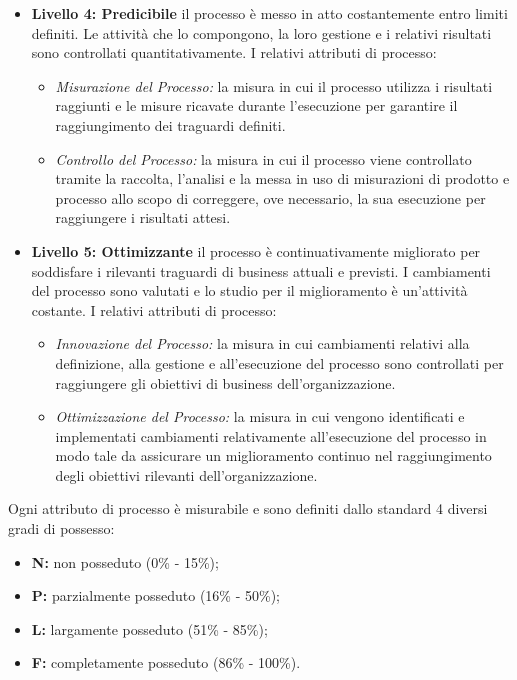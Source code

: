 \begin{itemize}
		\item \textbf{Livello 4: Predicibile} il processo è messo in atto costantemente entro limiti definiti. Le attività che lo compongono, la loro gestione e i relativi risultati sono controllati quantitativamente.
		I relativi attributi di processo:
			\begin{itemize}
				\item \emph{Misurazione del Processo:} la misura in cui il processo utilizza i risultati raggiunti e le misure ricavate durante l'esecuzione per garantire il raggiungimento dei traguardi definiti.
				\item \emph{Controllo del Processo:} la misura in cui il processo viene controllato tramite la raccolta, l'analisi e la messa in uso di misurazioni di prodotto e processo allo scopo di correggere, ove necessario, la sua esecuzione per raggiungere i risultati attesi.	
			\end{itemize}

		\item \textbf{Livello 5: Ottimizzante} il processo è continuativamente migliorato per soddisfare i rilevanti traguardi di business attuali e previsti. I cambiamenti del processo sono valutati e lo studio per il miglioramento è un'attività costante.
		I relativi attributi di processo:
			\begin{itemize}
				\item \emph{Innovazione del Processo:} la misura in cui cambiamenti relativi alla definizione, alla gestione e all'esecuzione del processo sono controllati per raggiungere gli obiettivi di business dell'organizzazione.
				\item \emph{Ottimizzazione del Processo:} la misura in cui vengono identificati e implementati cambiamenti relativamente all'esecuzione del processo in modo tale da assicurare un miglioramento continuo nel raggiungimento degli obiettivi rilevanti dell'organizzazione.
			\end{itemize}
		\end{itemize}

	Ogni attributo di processo è misurabile e sono definiti dallo standard 4 diversi gradi di possesso:
	\begin{itemize}
		\item \textbf{N:} non posseduto (0\% - 15\%);
		\item \textbf{P:} parzialmente posseduto (16\% - 50\%);
		\item \textbf{L:} largamente posseduto (51\% - 85\%);
		\item \textbf{F:} completamente posseduto (86\% - 100\%).
	\end{itemize}

